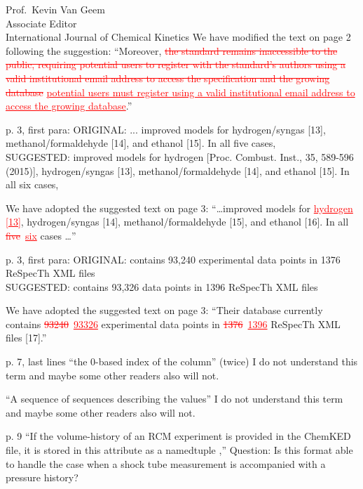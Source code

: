 \documentclass[11pt]{OSUletter}
\newcommand{\addtwo}[1]{{\sloppy\textcolor{red}{\uline{#1}}}}  %
\newcommand{\deletetwo}[1]{\sloppy\textcolor{red}{\sout{#1}}}    %
\begin{document}
\begin{letter}{
               Prof.~Kevin Van Geem\\
               Associate Editor\\
               International Journal of Chemical Kinetics
               }
We have modified the text on page 2 following the suggestion:
``Moreover, \deletetwo{the standard remains inaccessible to the public, requiring potential users
to register with the standard's authors using a valid institutional email address
to access the specification and the growing database}
\addtwo{potential users must register using a valid institutional email address
to access the growing database}.''

\begin{quoting}
    p. 3, first para:
    ORIGINAL:
    ... improved models for hydrogen/syngas [13], methanol/formaldehyde [14], and
    ethanol [15]. In all five cases, \\
    SUGGESTED:
    improved models for hydrogen [Proc. Combust. Inst.,  35, 589-596 (2015)],
    hydrogen/syngas [13], methanol/formaldehyde [14], and ethanol [15]. In all six cases,
\end{quoting}

We have adopted the suggested text on page 3:
``\ldots improved models for \addtwo{hydrogen [13]},
hydrogen\slash syngas [14], methanol\slash formaldehyde [15],
and ethanol [16]. In all \deletetwo{five}~\addtwo{six} cases \ldots''


\begin{quoting}
    p. 3, first para:
    ORIGINAL:
    contains 93,240 experimental data points in 1376 ReSpecTh XML files\\
    SUGGESTED:
    contains 93,326 data points in 1396 ReSpecTh XML files
\end{quoting}

We have adopted the suggested text on page 3:
``Their database currently contains \deletetwo{\num{93240}}~\addtwo{\num{93326}}
experimental data points in \deletetwo{1376}~\addtwo{1396}
ReSpecTh XML files [17].''

\begin{quoting}
    p. 7, last lines
    ``the 0-based index of the column'' (twice)
    I do not understand this term and maybe some other readers also will not.
\end{quoting}



\begin{quoting}
    ``A sequence of sequences describing the values''
    I do not understand this term and maybe some other readers also will not.
\end{quoting}



\begin{quoting}
    p. 9
    ``If the volume-history of an RCM experiment is provided in the
    ChemKED file, it is stored in this attribute as a namedtuple ,''
    Question: Is this format able to handle the case when a shock tube measurement
    is accompanied with a pressure history?
\end{quoting}




\end{letter}
\end{document}
